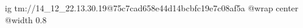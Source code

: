  
 
 
 
 

\qqSecOrig


\ifcmt
  ig tm://14_12_22.13.30.19@75c7cad658e44d14bcbfc19e7c08af5a
  @wrap center
  @width 0.8
\fi

